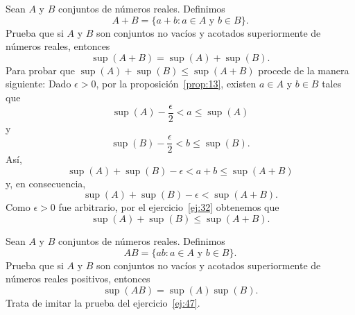 \documentclass[12pt,a4paper]{book}
\begin{document}
    \begin{ejercicio}\label{ej:47}
        Sean $A$ y $B$ conjuntos de números reales. Definimos
        \begin{equation*}
            A+B=\{a+b:a\in A\text{ y }b\in B\}.
        \end{equation*}
        Prueba que si $A$ y $B$ son conjuntos no vacíos y acotados superiormente de
        números reales, entonces
        \begin{equation*}
            \sup(A+B)=\sup(A)+\sup(B).
        \end{equation*}
        \sugerencia Para probar que $\sup(A)+\sup(B)\leq\sup(A+B)$ procede de
        la manera siguiente: Dado $\epsilon>0$, por la proposición~\ref{prop:13}, existen $a\in A$ y $b\in B$
        tales que
        \begin{equation*}
            \sup(A)-\frac{\epsilon}{2}<a\leq\sup(A)
        \end{equation*}
        y
        \begin{equation*}
            \sup(B)-\frac{\epsilon}{2}<b\leq\sup(B).
        \end{equation*}
        Así,
        \begin{equation*}
            \sup(A)+\sup(B)-\epsilon<a+b\leq\sup(A+B)
        \end{equation*}
        y, en consecuencia,
        \begin{equation*}
            \sup(A)+\sup(B)-\epsilon<\sup(A+B).
        \end{equation*}
        Como $\epsilon>0$ fue arbitrario, por el ejercicio~\ref{ej:32} obtenemos que
        \begin{equation*}
            \sup(A)+\sup(B)\leq\sup(A+B).
        \end{equation*}
    \end{ejercicio}

    \begin{ejercicio}\label{ej:48}
        Sean $A$ y $B$ conjuntos de números reales. Definimos
        \begin{equation*}
            AB=\{ab:a\in A\text{ y }b\in B\}.
        \end{equation*}
        Prueba que si $A$ y $B$ son conjuntos no vacíos y acotados superiormente de
        números reales positivos, entonces
        \begin{equation*}
            \sup(AB)=\sup(A)\sup(B).
        \end{equation*}
        \sugerencia Trata de imitar la prueba del ejercicio~\ref{ej:47}.
    \end{ejercicio}
\end{document}
